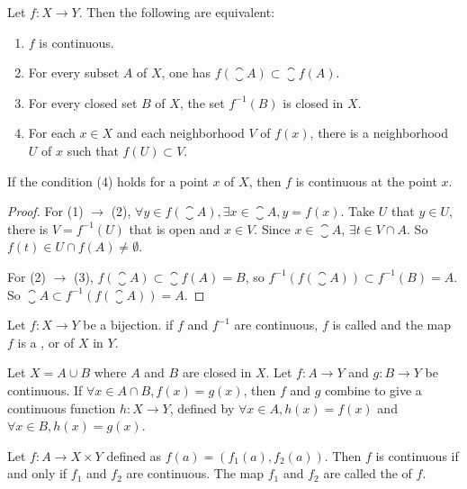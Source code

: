 \begin{theorem}
Let $f: X \rightarrow Y$. Then the following are equivalent:
\begin{enumerate}
    \item $f$ is continuous.
    \item For every subset $A$ of $X$, one has $f(\closure{A}) \subset \closure{f(A)}$.
    \item For every closed set $B$ of $X$, the set $f^{-1}(B)$ is closed in $X$.
    \item For each $x\in X$ and each neighborhood $V$ of $f(x)$, there is a neighborhood $U$ of $x$ such that $f(U) \subset V$.
\end{enumerate}    

If the condition (4) holds for a point $x$ of $X$, then $f$ is continuous at the point $x$.
\end{theorem}
\begin{proof}
    For (1) $\rightarrow$ (2), $\forall y \in f(\closure{A}), \exists x \in \closure{A}, y = f(x)$. Take $U$ that $y \in U$, there is $V = f^{-1}(U)$ that is open and $x \in V$. Since $x \in \closure{A}$, $\exists t \in V \cap A$. So $f(t) \in U \cap f(A) \neq \emptyset$.
    
    For (2) $\rightarrow$ (3), $f(\closure{A}) \subset \closure{f(A)} = B$, so $f^{-1} \left(f(\closure{A}) \right) \subset f^{-1}(B) = A$. So $\closure{A} \subset f^{-1} \left(f(\closure{A}) \right) = A$.
\end{proof}


\begin{definition}
    Let $f:X \rightarrow Y$ be a bijection. if $f$ and $f^{-1}$ are continuous, $f$ is called  and the map $f$ is a , or  of $X$ in $Y$.
\end{definition}


\begin{theorem}
    Let $X = A \cup B$ where $A$ and $B$ are closed in $X$. Let $f: A \rightarrow Y$ and $g: B \rightarrow Y$ be continuous. If $\forall x \in A \cap B, f(x) = g(x)$, then $f$ and $g$ combine to give a continuous function $h: X \rightarrow Y$, defined by $\forall x \in A, h(x) = f(x) $ and $\forall x \in B , h(x) = g(x)$.
\end{theorem}

\begin{theorem}
Let $f: A \rightarrow X \times Y$ defined as $f(a) = \left(f_1(a), f_2(a) \right)$. Then $f$ is continuous if and only if $f_1$ and $f_2$ are continuous. The map $f_1$ and $f_2$ are called the  of $f$.
\end{theorem}


